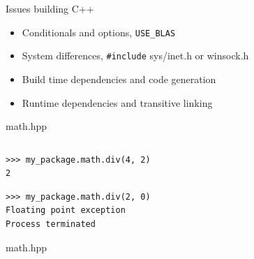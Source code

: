 \documentclass[pdf]{beamer}
\begin{document}
\begin{frame}[fragile]{Issues building C++}
    \begin{itemize}[<+->]
        \item Conditionals and options, \verb|USE_BLAS|
        \item System differences, \verb|#include| sys/inet.h or winsock.h
        \item Build time dependencies and code generation
        \item Runtime dependencies and transitive linking
    \end{itemize}

\end{frame}

\begin{frame}{math.hpp}
    \inputminted{c++}{my-package/template-div1.cpp}
\end{frame}

\begin{frame}[fragile]
    \begin{verbatim}
>>> my_package.math.div(4, 2)
2
    \end{verbatim}
\end{frame}

\begin{frame}[fragile]
    \begin{verbatim}
>>> my_package.math.div(2, 0)
Floating point exception
Process terminated
    \end{verbatim}
\end{frame}

\begin{frame}{math.hpp}
    \inputminted{c++}{my-package/template-div2.cpp}
\end{frame}
\end{document}
